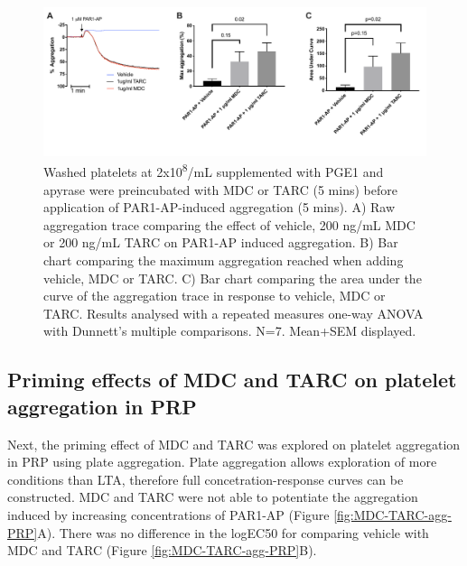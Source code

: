 \documentclass[11pt,twoside]{bristolthesis}
\begin{document}
\begin{figure}
\includegraphics[width=0.8\linewidth]{figure/Chemokines/Layouts/MDC_TARC_aggregation_PAR1} \caption[The priming effect of the chemokines MDC and TARC on PAR1-AP induced platelet aggregation in washed platelets]{Washed platelets at 2x10\textsuperscript{8}/mL supplemented with PGE1 and apyrase were preincubated with MDC or TARC (5 mins) before application of PAR1-AP-induced aggregation (5 mins). A) Raw aggregation trace comparing the effect of vehicle, 200 ng/mL MDC or 200 ng/mL TARC on PAR1-AP induced aggregation. B) Bar chart comparing the maximum aggregation reached when adding vehicle, MDC or TARC. C) Bar chart comparing the area under the curve of the aggregation trace in response to vehicle, MDC or TARC. Results analysed with a repeated measures one-way ANOVA with Dunnett's multiple comparisons. N=7. Mean+SEM displayed.}\label{fig:MDC-TARC-agg}
\end{figure}
\hypertarget{priming-effects-of-mdc-and-tarc-on-platelet-aggregation-in-prp}{%
\subsection{Priming effects of MDC and TARC on platelet aggregation in PRP}\label{priming-effects-of-mdc-and-tarc-on-platelet-aggregation-in-prp}}

Next, the priming effect of MDC and TARC was explored on platelet aggregation in PRP using plate aggregation. Plate aggregation allows exploration of more conditions than LTA, therefore full concetration-response curves can be constructed. MDC and TARC were not able to potentiate the aggregation induced by increasing concentrations of PAR1-AP (Figure \ref{fig:MDC-TARC-agg-PRP}A). There was no difference in the logEC50 for comparing vehicle with MDC and TARC (Figure \ref{fig:MDC-TARC-agg-PRP}B).
\end{document}
